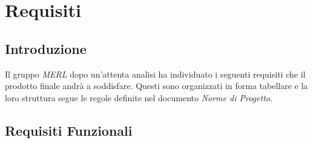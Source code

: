 \chapter{Requisiti}

\renewcommand\arraystretch{1,5}

\section{Introduzione}
Il gruppo \textit{MERL} dopo un'attenta analisi ha individuato i seguenti requisiti che il prodotto finale andrà a soddisfare. Questi sono organizzati in forma tabellare e la loro struttura segue le regole definite nel documento \textit{Norme di Progetto}.

\section{Requisiti Funzionali}

